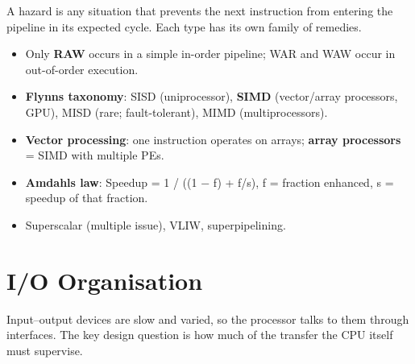 A hazard is any situation that prevents the next instruction from entering the pipeline in its expected
cycle. Each type has its own family of remedies.



\begin{itemize}
\tightlist
\item
  Only \textbf{RAW} occurs in a simple in-order pipeline; WAR and WAW occur in out-of-order execution.
\item
  \textbf{Flynn\textquotesingle s taxonomy}: SISD (uniprocessor), \textbf{SIMD} (vector/array processors, GPU), MISD (rare; fault-tolerant), MIMD (multiprocessors).
\item
  \textbf{Vector processing}: one instruction operates on arrays; \textbf{array processors} = SIMD with multiple PEs.
\item
  \textbf{Amdahl\textquotesingle s law}: Speedup = 1 / ((1 − f) + f/s), f = fraction enhanced, s = speedup of that fraction.
\item
  Superscalar (multiple issue), VLIW, superpipelining.
\end{itemize}

\needspace{125pt}

\hypertarget{p2-02--8-io-organisation}{%
\section{I/O Organisation}\label{p2-02--8-io-organisation}}

Input--output devices are slow and varied, so the processor talks to them through interfaces. The key
design question is how much of the transfer the CPU itself must supervise.



\begingroup\small


